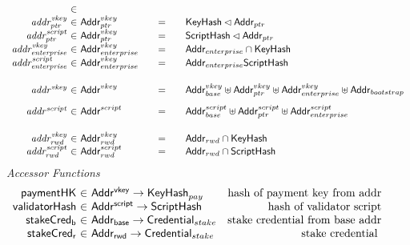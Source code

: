 \begin{figure*}[hbt]
\begin{equation*}
\begin{array}{r@{~\in~}l@{\qquad=\qquad}lr}
      \\
      \var{addr^{vkey}_{ptr}}
                 & \Addr^{vkey}_{ptr}
                               & \KeyHash\restrictdom\Addr_{ptr}
      \\
      \var{addr^{script}_{ptr}}
                 & \Addr^{vkey}_{ptr}
                               & \HashScr\restrictdom\Addr_{ptr}
      \\
      \var{addr^{vkey}_{enterprise}}
                 & \Addr^{vkey}_{enterprise}
                               & \Addr_{enterprise}\cap\KeyHash
      \\
      \var{addr^{script}_{enterprise}}
                 & \Addr^{vkey}_{enterprise}
                               & \Addr_{enterprise}\HashScr
      \\[0.5cm]
      \var{addr^{vkey}} &
             \Addr^{vkey} &
                            \Addr^{vkey}_{base} \uniondistinct \Addr^{vkey}_{ptr} \uniondistinct \Addr^{vkey}_{enterprise} \uniondistinct \Addr_{bootstrap}\\[0.3cm]
      \var{addr^{script}} &
                            \Addr^{script} &
                                             \Addr^{script}_{base}
                                             \uniondistinct \Addr^{script}_{ptr}
                                             \uniondistinct
                                             \Addr^{script}_{enterprise}
      \\[0.5cm]
      \var{addr_{rwd}^{vkey}} & \Addr_{rwd}^{vkey} & \Addr_{rwd}\cap\KeyHash \\
      \var{addr_{rwd}^{script}} & \Addr_{rwd}^{script} & \Addr_{rwd}\cap\HashScr \\
    \end{array}
  \end{equation*}
  \emph{Accessor Functions}
  \begin{equation*}
    \begin{array}{r@{~\in~}lr}
      \fun{paymentHK} & \AddrVKey \to \KeyHash_{pay}
      & \text{hash of payment key from addr}\\
      \fun{validatorHash} & \AddrScr \to \HashScr & \text{hash of validator
                                                    script} \\
            \fun{stakeCred_{b}} & \AddrB \to
                          \StakeCredential & \text{stake credential from base
                                      addr}\\
      \fun{stakeCred_{r}} & \AddrRWD \to \StakeCredential & \text{stake credential
}
\end{array}
\end{equation*}
\end{figure*}
